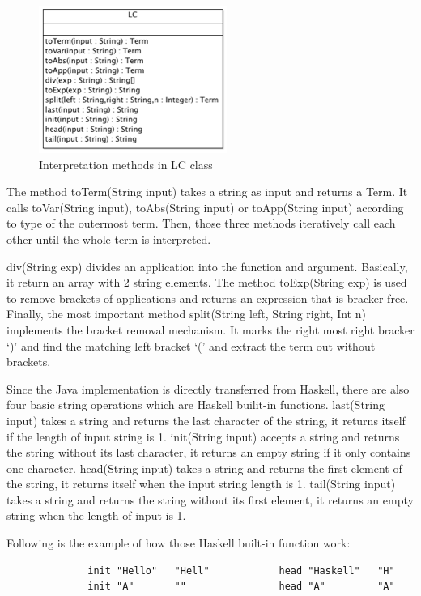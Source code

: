 \begin{figure}[ht]
\centering
\includegraphics[scale=0.6]{pics/LC}
\caption{Interpretation methods in LC class}
\label{fig:inter}
\end{figure}

The method \textsf{toTerm(String input)} takes a string as input and returns a \textsf{Term}. It calls \textsf{toVar(String input), toAbs(String input)} or \textsf{toApp(String input)} according to type of the outermost term. Then, those three methods iteratively call each other until the whole term is interpreted.   

\textsf{div(String exp)} divides an application into the function and argument. Basically, it return an array with 2 string elements. The method \textsf{toExp(String exp)} is used to remove brackets of applications and returns an expression that is bracker-free. Finally, the most important method \textsf{split(String left, String right, Int n)} implements the bracket removal mechanism. It marks the right most right bracker `)' and find the matching left bracket `(' and extract the term out without brackets.

Since the Java implementation is directly transferred from Haskell, there are also four basic string operations which are Haskell builit-in functions. \textsf{last(String input)} takes a string and returns the last character of the string, it returns itself if the length of input string is 1. \textsf{init(String input)} accepts a string and returns the string without its last character, it returns an empty string if it only contains one character. \textsf{head(String input)} takes a string and returns the first element of the string, it returns itself when the input string length is 1. \textsf{tail(String input)} takes a string and returns the string without its first element, it returns an empty string when the length of input is 1. 

Following is the example of how those Haskell built-in function work:

\begin{verbatim}
              init "Hello"   "Hell"            head "Haskell"   "H" 
              init "A"       ""                head "A"         "A"
\end{verbatim}


